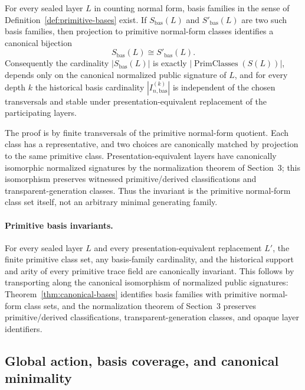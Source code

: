 \documentclass{lmcs}
\begin{document}
\begin{thm}
\label{thm:canonical-bases}
For every sealed layer \(L\) in counting normal form, basis families in the sense of
Definition~\ref{def:primitive-bases} exist.  If \(S_{\mathrm{bas}}(L)\) and
\(S'_{\mathrm{bas}}(L)\) are two such basis
families, then projection to primitive normal-form classes identifies a canonical bijection
\[
  S_{\mathrm{bas}}(L) \cong S'_{\mathrm{bas}}(L).
\]
Consequently the cardinality \(|S_{\mathrm{bas}}(L)|\) is exactly
\(|\operatorname{PrimClasses}(S(L))|\), depends only on the canonical normalized public
signature of \(L\), and for every depth \(k\) the historical basis cardinality
\(|I_{n,\mathrm{bas}}^{(k)}|\) is independent of the chosen transversals and stable under
presentation-equivalent replacement of the participating layers.
\end{thm}

The proof is by finite transversals of the primitive normal-form quotient.  Each class has a
representative, and two choices are canonically matched by projection to the same primitive
class.  Presentation-equivalent layers have canonically isomorphic normalized signatures by
the normalization theorem of Section~3; this isomorphism preserves witnessed primitive/derived
classifications and transparent-generation classes.  Thus the invariant is the primitive
normal-form class set itself, not an arbitrary minimal generating family.

\paragraph{Primitive basis invariants.}
For every sealed layer \(L\) and every presentation-equivalent replacement \(L'\), the finite
primitive class set, any basis-family cardinality, and the historical support and arity of every
primitive trace field are canonically invariant.  This follows by transporting along the
canonical isomorphism of normalized public signatures: Theorem~\ref{thm:canonical-bases}
identifies basis families with primitive normal-form class sets, and the normalization theorem
of Section~3 preserves primitive/derived classifications, transparent-generation classes, and
opaque layer identifiers.

\subsection{Global action, basis coverage, and canonical minimality}
\end{document}

